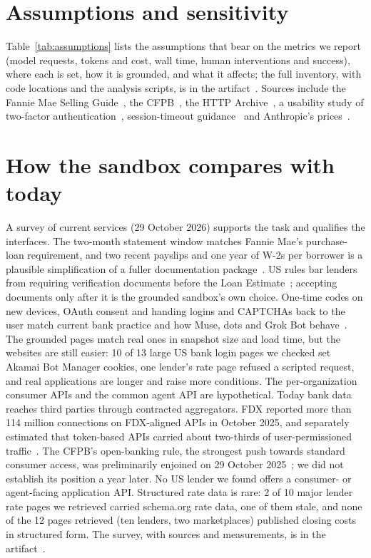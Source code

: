 \documentclass[11pt]{article}
\begin{document}
\section{Assumptions and sensitivity}\label{sec:assumptions}

Table~\ref{tab:assumptions} lists the assumptions that bear on the metrics we report (model requests, tokens and cost, wall time, human interventions and success), where each is set, how it is grounded, and what it affects; the full inventory, with code locations and the analysis scripts, is in the artifact~\cite{artifact}. Sources include the Fannie Mae Selling Guide~\cite{fanniemaeassets,fanniemaedeposits}, the CFPB~\cite{cfpbmultiple,ecfr1026}, the HTTP Archive~\cite{webalmanac}, a usability study of two-factor authentication~\cite{reese2fa}, session-timeout guidance~\cite{nist80063b} and Anthropic's prices~\cite{anthropicpricing}.



\section{How the sandbox compares with today}\label{sec:realism}

A survey of current services (29 October 2026) supports the task and qualifies the interfaces. The two-month statement window matches Fannie Mae's purchase-loan requirement, and two recent payslips and one year of W-2s per borrower is a plausible simplification of a fuller documentation package~\cite{fanniemaeassets}. US rules bar lenders from requiring verification documents before the Loan Estimate~\cite{ecfr1026}; accepting documents only after it is the grounded sandbox's own choice. One-time codes on new devices, OAuth consent and handing logins and CAPTCHAs back to the user match current bank practice and how Muse, dots and Grok Bot behave~\cite{musesafety,dotsdocs,grokdocs}. The grounded pages match real ones in snapshot size and load time, but the websites are still easier: 10 of 13 large US bank login pages we checked set Akamai Bot Manager cookies, one lender's rate page refused a scripted request, and real applications are longer and raise more conditions. The per-organization consumer APIs and the common agent API are hypothetical. Today bank data reaches third parties through contracted aggregators. FDX reported more than 114 million connections on FDX-aligned APIs in October 2025, and separately estimated that token-based APIs carried about two-thirds of user-permissioned traffic~\cite{fdxletter}. The CFPB's open-banking rule, the strongest push towards standard consumer access, was preliminarily enjoined on 29 October 2025~\cite{aba1033}; we did not establish its position a year later. No US lender we found offers a consumer- or agent-facing application API. Structured rate data is rare: 2 of 10 major lender rate pages we retrieved carried schema.org rate data, one of them stale, and none of the 12 pages retrieved (ten lenders, two marketplaces) published closing costs in structured form. The survey, with sources and measurements, is in the artifact~\cite{artifact}.
\end{document}
